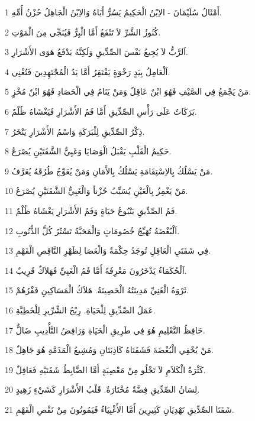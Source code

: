\par 1 أَمْثَالُ سُلَيْمَانَ - الاِبْنُ الْحَكِيمُ يَسُرُّ أَبَاهُ وَالاِبْنُ الْجَاهِلُ حُزْنُ أُمِّهِ.
\par 2 كُنُوزُ الشَّرِّ لاَ تَنْفَعُ أَمَّا الْبِرُّ فَيُنَجِّي مِنَ الْمَوْتِ.
\par 3 اَلرَّبُّ لاَ يُجِيعُ نَفْسَ الصِّدِّيقِ وَلَكِنَّهُ يَدْفَعُ هَوَى الأَشْرَارِ.
\par 4 اَلْعَامِلُ بِيَدٍ رَخْوَةٍ يَفْتَقِرُ أَمَّا يَدُ الْمُجْتَهِدِينَ فَتُغْنِي.
\par 5 مَنْ يَجْمَعُ فِي الصَّيْفِ فَهُوَ ابْنٌ عَاقِلٌ وَمَنْ يَنَامُ فِي الْحَصَادِ فَهُوَ ابْنٌ مُخْزٍ.
\par 6 بَرَكَاتٌ عَلَى رَأْسِ الصِّدِّيقِ أَمَّا فَمُ الأَشْرَارِ فَيَغْشَاهُ ظُلْمٌ.
\par 7 ذِكْرُ الصِّدِّيقِ لِلْبَرَكَةِ وَاسْمُ الأَشْرَارِ يَنْخَرُ.
\par 8 حَكِيمُ الْقَلْبِ يَقْبَلُ الْوَصَايَا وَغَبِيُّ الشَّفَتَيْنِ يُصْرَعُ.
\par 9 مَنْ يَسْلُكُ بِالاِسْتِقَامَةِ يَسْلُكُ بِالأَمَانِ وَمَنْ يُعَوِّجُ طُرُقَهُ يُعَرَّفُ.
\par 10 مَنْ يَغْمِزُ بِالْعَيْنِ يُسَبِّبُ حُزْناً وَالْغَبِيُّ الشَّفَتَيْنِ يُصْرَعُ.
\par 11 فَمُ الصِّدِّيقِ يَنْبُوعُ حَيَاةٍ وَفَمُ الأَشْرَارِ يَغْشَاهُ ظُلْمٌ.
\par 12 اَلْبُغْضَةُ تُهَيِّجُ خُصُومَاتٍ وَالْمَحَبَّةُ تَسْتُرُ كُلَّ الذُّنُوبِ.
\par 13 فِي شَفَتَيِ الْعَاقِلِ تُوجَدُ حِكْمَةٌ وَالْعَصَا لِظَهْرِ النَّاقِصِ الْفَهْمِ.
\par 14 اَلْحُكَمَاءُ يَذْخَرُونَ مَعْرِفَةً أَمَّا فَمُ الْغَبِيِّ فَهَلاَكٌ قَرِيبٌ.
\par 15 ثَرْوَةُ الْغَنِيِّ مَدِينَتُهُ الْحَصِينَةُ. هَلاَكُ الْمَسَاكِينِ فَقْرُهُمْ.
\par 16 عَمَلُ الصِّدِّيقِ لِلْحَيَاةِ. رِبْحُ الشِّرِّيرِ لِلْخَطِيَّةِ.
\par 17 حَافِظُ التَّعْلِيمِ هُوَ فِي طَرِيقِ الْحَيَاةِ وَرَافِضُ التَّأْدِيبِ ضَالٌّ.
\par 18 مَنْ يُخْفِي الْبُغْضَةَ فَشَفَتَاهُ كَاذِبَتَانِ وَمُشِيعُ الْمَذَمَّةِ هُوَ جَاهِلٌ.
\par 19 كَثْرَةُ الْكَلاَمِ لاَ تَخْلُو مِنْ مَعْصِيَةٍ أَمَّا الضَّابِطُ شَفَتَيْهِ فَعَاقِلٌ.
\par 20 لِسَانُ الصِّدِّيقِ فِضَّةٌ مُخْتَارَةٌ. قَلْبُ الأَشْرَارِ كَشَيْءٍ زَهِيدٍ.
\par 21 شَفَتَا الصِّدِّيقِ تَهْدِيَانِ كَثِيرِينَ أَمَّا الأَغْبِيَاءُ فَيَمُوتُونَ مِنْ نَقْصِ الْفَهْمِ.
